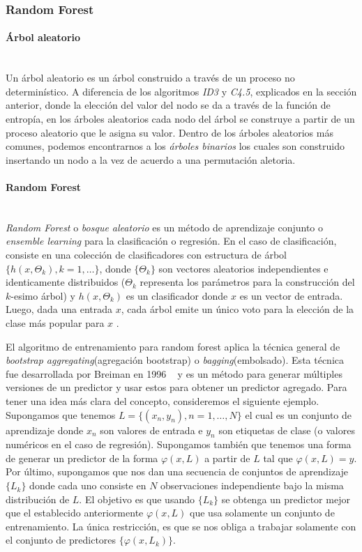 \subsubsection{Random Forest}

	\paragraph{Árbol aleatorio} ~\\
	
	Un árbol aleatorio es un árbol construido a través de un proceso no determinístico. A diferencia de los algoritmos \textit{ID3} y \textit{C4.5}, explicados en la sección anterior, donde la elección del valor del nodo se da a través de la función de entropía, en los árboles aleatorios cada nodo del árbol se construye a partir de un proceso aleatorio que le asigna su valor. Dentro de los árboles aleatorios más comunes, podemos encontrarnos a  los \textit{árboles binarios} los cuales son construido insertando un nodo a la vez de acuerdo a una permutación aletoria.

	\paragraph{Random Forest} ~\\

	\textit{Random Forest} o \textit{bosque aleatorio} es un método de aprendizaje conjunto o\textit{ ensemble learning} para la clasificación o regresión. En el caso de clasificación, consiste en una colección de clasificadores con estructura de árbol $\{h(x,\Theta_k), k = 1,\dots\}$, donde $\{\Theta_k\}$ son vectores aleatorios independientes e identicamente distribuidos ($\Theta_k$ representa los parámetros para la construcción del $k$-esimo árbol) y $h(x,\Theta_k)$ es un clasificador donde $x$ es un vector de entrada. Luego, dada una entrada $x$, cada árbol emite un único voto para la elección de la clase más popular para $x$ \cite{Breiman01}.

	El algoritmo de entrenamiento para random forest aplica la técnica general de \textit{bootstrap aggregating}(agregación bootstrap) o \textit{bagging}(embolsado). Esta técnica fue desarrollada por Breiman en 1996 ~\cite{LBreiman96} y es un método para generar múltiples versiones de un predictor y usar estos para obtener un predictor agregado. Para tener una idea más clara del concepto, consideremos el siguiente ejemplo. Supongamos que tenemos $L = \{ (x_n,y_n), n = 1,\dots, N \}$ el cual es un conjunto de aprendizaje donde $x_n$ son valores de entrada e $y_n$ son etiquetas de clase (o valores numéricos en el caso de regresión). Supongamos también que tenemos una forma de generar un predictor de la forma $\varphi(x,L)$ a partir de $L$ tal que $ \varphi(x,L) = y $. Por último, supongamos que nos dan una secuencia de conjuntos de aprendizaje $\{ L_k \}$ donde cada uno consiste en $N$ observaciones independiente bajo la misma distribución de $L$. El objetivo es que usando $\{ L_k \}$ se obtenga un predictor mejor que el establecido anteriormente $\varphi(x,L)$ que usa solamente un conjunto de entrenamiento. La única restricción, es que se nos obliga a trabajar solamente con el conjunto de predictores $\{ \varphi(x, L_k)\} $.

